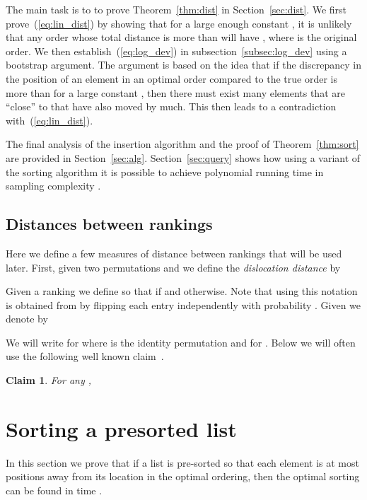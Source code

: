 \documentclass[11pt]{article}
\newtheorem{claim}[theorem]{Claim}
\begin{document}
The main task is to to prove Theorem~\ref{thm:dist} in 
Section~\ref{sec:dist}. We first prove~(\ref{eq:lin_dist}) by showing that 
for a large enough constant , it 
is unlikely that any order  whose total distance is more than  will have , where  is the original order.  
We then establish~(\ref{eq:log_dev}) in subsection~\ref{subsec:log_dev} 
using a bootstrap argument. 
The argument is based on the idea that if the discrepancy in the position of 
an element  in an optimal order compared to the true order is more 
than  for a large constant , then there must exist many elements 
that are ``close'' to  that have also moved by much. 
This then leads to a contradiction with~(\ref{eq:lin_dist}). 

The final analysis of the insertion algorithm and the proof of Theorem~\ref{thm:sort} are provided in Section~\ref{sec:alg}. Section~\ref{sec:query} shows 
how using a variant of the sorting algorithm it is possible to achieve 
polynomial running time in sampling complexity .

\subsection{Distances between rankings}
Here we define a few measures of distance between rankings that will be used 
later. First, given two permutations  and  we define the 
{\em dislocation distance} by 

Given a ranking  we define  
so that  if
 and  otherwise. 
Note that using this notation  is obtained from  by flipping each 
entry independently with probability . 
Given  
we denote by 
 
We will write  for  where  is the identity 
permutation and  for . 
Below we will often use the following well known 
claim~\cite{DiaconisGraham:77}.
\begin{claim}
\label{cl:sd}
For any ,

\end{claim}





\section{Sorting a presorted list} \label{sec:presorted}

In this section we prove that if a list is pre-sorted so that each 
element is at most  positions away from its location in the optimal
ordering, then the optimal sorting can be found in time .
\end{document}
